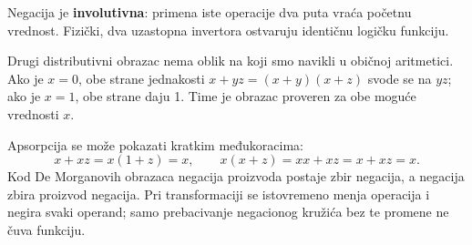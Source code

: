 
Negacija je \textbf{involutivna}: primena iste operacije dva puta vraća početnu vrednost. Fizički, dva uzastopna invertora ostvaruju identičnu logičku funkciju.

Drugi distributivni obrazac nema oblik na koji smo navikli u običnoj aritmetici. Ako je \(x=0\), obe strane jednakosti \(x+yz=(x+y)(x+z)\) svode se na \(yz\); ako je \(x=1\), obe strane daju 1. Time je obrazac proveren za obe moguće vrednosti \(x\).

Apsorpcija se može pokazati kratkim međukoracima:
\[
x+xz=x(1+z)=x,\qquad x(x+z)=xx+xz=x+xz=x.
\]
Kod De Morganovih obrazaca negacija proizvoda postaje zbir negacija, a negacija zbira proizvod negacija. Pri transformaciji se istovremeno menja operacija i negira svaki operand; samo prebacivanje negacionog kružića bez te promene ne čuva funkciju.
